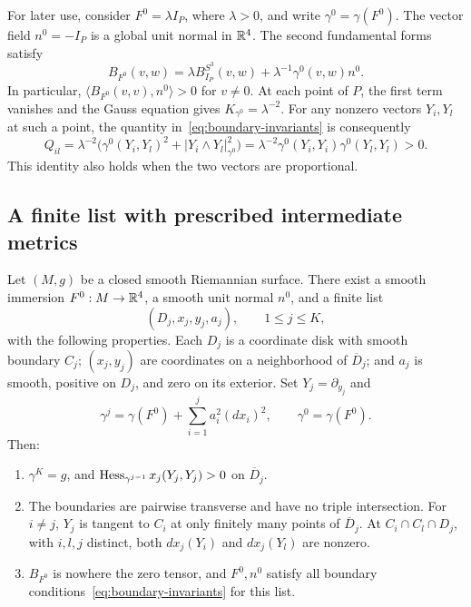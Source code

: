 For later use, consider $F^0=\lambda I_P$, where $\lambda>0$, and write
$\gamma^0=\gamma(F^0)$.  The vector field $n^0=-I_P$ is a global unit normal
in $\mathbb{R}^4$.  The second fundamental forms satisfy
\begin{equation}
 B_{F^0}(v,w)
   =\lambda B_{I_P}^{S^3}(v,w)
       +\lambda^{-1}\gamma^0(v,w)n^0.
 \label{eq:spherical-radial-form}
\end{equation}
In particular, $\langle B_{F^0}(v,v),n^0\rangle>0$ for $v\ne0$.
At each point of $P$, the first term vanishes and the Gauss equation gives
$K_{\gamma^0}=\lambda^{-2}$.  For any nonzero vectors $Y_i,Y_l$ at such a
point, the quantity in~\eqref{eq:boundary-invariants} is consequently
\begin{equation}
 Q_{il}
 =\lambda^{-2}\bigl(
      \gamma^0(Y_i,Y_l)^2+|Y_i\wedge Y_l|_{\gamma^0}^2\bigr)
 =\lambda^{-2}\gamma^0(Y_i,Y_i)\gamma^0(Y_l,Y_l)>0.
 \label{eq:initial-crossing-positivity}
\end{equation}
This identity also holds when the two vectors are proportional.

\subsection{A finite list with prescribed intermediate metrics}

\begin{lemma}
\label{lem:global-preparation}
Let $(M,g)$ be a closed smooth Riemannian surface.  There exist a smooth
immersion $F^0:M\to\mathbb{R}^4$, a smooth unit normal $n^0$, and a finite list
\[
 (D_j,x_j,y_j,a_j),\qquad 1\le j\le K,
\]
with the following properties.  Each $D_j$ is a coordinate disk with smooth
boundary $C_j$; $(x_j,y_j)$ are coordinates on a neighborhood of
$\overline D_j$; and $a_j$ is smooth, positive on $D_j$, and zero on its
exterior.  Set $Y_j=\partial_{y_j}$ and
\[
 \gamma^j=\gamma(F^0)+\sum_{i=1}^j a_i^2(dx_i)^2,
 \qquad \gamma^0=\gamma(F^0).
\]
Then:
\begin{enumerate}
\item $\gamma^K=g$, and
      $\operatorname{Hess}_{\gamma^{j-1}}x_j(Y_j,Y_j)>0$ on $\overline D_j$.
\item The boundaries are pairwise transverse and have no triple
      intersection.  For $i\ne j$, $Y_j$ is tangent to $C_i$ at only finitely
      many points of $\overline D_j$.  At $C_i\cap C_l\cap D_j$, with
      $i,l,j$ distinct, both $dx_j(Y_i)$ and $dx_j(Y_l)$ are nonzero.
\item $B_{F^0}$ is nowhere the zero tensor, and $F^0,n^0$ satisfy all
      boundary conditions~\eqref{eq:boundary-invariants} for this list.
\end{enumerate}
\end{lemma}

